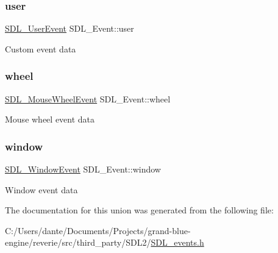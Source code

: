 \subsubsection{\texorpdfstring{user}{user}}
{\footnotesize\ttfamily \mbox{\hyperlink{struct_s_d_l___user_event}{S\+D\+L\+\_\+\+User\+Event}} S\+D\+L\+\_\+\+Event\+::user}

Custom event data \mbox{\label{union_s_d_l___event_a267d3f550715519ec90a81ccd0e6cbda}} 
\subsubsection{\texorpdfstring{wheel}{wheel}}
{\footnotesize\ttfamily \mbox{\hyperlink{struct_s_d_l___mouse_wheel_event}{S\+D\+L\+\_\+\+Mouse\+Wheel\+Event}} S\+D\+L\+\_\+\+Event\+::wheel}

Mouse wheel event data \mbox{\label{union_s_d_l___event_a826936b3275406d857bc6654669fae71}} 
\subsubsection{\texorpdfstring{window}{window}}
{\footnotesize\ttfamily \mbox{\hyperlink{struct_s_d_l___window_event}{S\+D\+L\+\_\+\+Window\+Event}} S\+D\+L\+\_\+\+Event\+::window}

Window event data 

The documentation for this union was generated from the following file\+:\begin{DoxyCompactItemize}
\item 
C\+:/\+Users/dante/\+Documents/\+Projects/grand-\/blue-\/engine/reverie/src/third\+\_\+party/\+S\+D\+L2/\mbox{\hyperlink{_s_d_l__events_8h}{S\+D\+L\+\_\+events.\+h}}\end{DoxyCompactItemize}
